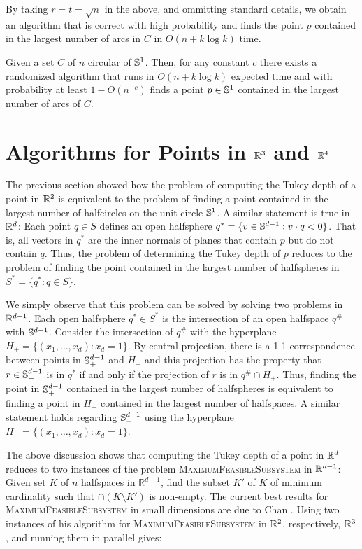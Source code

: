 \documentclass[charterfonts,lotsofwhite]{patmorin}
\begin{document}
By taking $r=t=\sqrt{n}$ in the above, and ommitting standard details,
we obtain an algorithm that is correct with high probability and finds
the point $p$ contained in the largest number of arcs in $C$ in
$O(n+k\log k)$ time.

\begin{thm}
Given a set $C$ of $n$ circular of $\mathbb{S}^1$.  Then, for any constant
$c$ there exists a randomized
algorithm that runs in $O(n+k\log
k)$ expected time and with probability at least $1-O(n^{-c})$ finds
a point $p\in\mathbb{S}^1$ contained in the largest number of arcs of $C$.
\end{thm}


\section{Algorithms for Points in $\mathbb{R}^3$ and $\mathbb{R}^4$}

The previous section showed how the problem of computing the Tukey
depth of a point in $\mathbb{R}^2$ is equivalent to the problem of finding a
point contained in the largest number of halfcircles on the unit
circle $\mathbb{S}^1$.  A similar statement is true in $\mathbb{R}^d$:  Each point
$q\in S$ defines an open halfsphere $q^*=\{ v\in\mathbb{S}^{d-1} : v\cdot q <
0\}$.  That is, all vectors in $q^*$ are the inner normals of planes
that contain $p$ but do not contain $q$.  Thus, the problem of
determining the Tukey depth of $p$ reduces to the problem of finding
the point contained in the largest number of halfspheres in $S^*=\{q^*
: q\in S\}$.

We simply observe that this problem can be solved by solving two
problems in $\mathbb{R}^{d-1}$.  Each open halfsphere $q^*\in S^*$ is the
intersection of an open halfspace $q^\#$ with $\mathbb{S}^{d-1}$.  Consider
the intersection of $q^\#$ with the hyperplane
$H_+=\{(x_1,\ldots,x_d):x_d=1\}$.  By central projection, there is a
1-1 correspondence between points in $\mathbb{S}^{d-1}_+$ and $H_+$ and this
projection has the property that $r\in\mathbb{S}^{d-1}_+$ is in $q^*$ if and
only if the projection of $r$ is in $q^\#\cap H_+$.  Thus, finding the
point in $\mathbb{S}^{d-1}_+$ contained in the largest number of halfspheres
is equivalent to finding a point in $H_+$ contained in the largest
number of halfspaces.  A similar statement holds regarding
$\mathbb{S}^{d-1}_-$ using the hyperplane $H_-=\{(x_1,\ldots,x_d):x_d=1\}$.

The above discussion shows that computing the Tukey depth of a point
in $\mathbb{R}^d$ reduces to two instances of the problem
\textsc{MaximumFeasibleSubsystem} in $\mathbb{R}^{d-1}$: Given set $K$ of $n$
halfspaces in $\mathbb{R}^{d-1}$, find the subset $K'$ of $K$ of
minimum cardinality such that $\cap (K\setminus K')$ is non-empty.
The current best results for \textsc{MaximumFeasibleSubsystem} in
small dimensions are due to Chan \cite{c04}.  Using two instances of
his algorithm for \textsc{MaximumFeasibleSubsystem} in $\mathbb{R}^2$,
respectively, $\mathbb{R}^3$, and running them in parallel gives:
\end{document}
